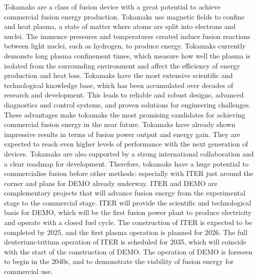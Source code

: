 Tokamaks are a class of fusion device with a great potential to achieve commercial fusion energy production. Tokamaks use magnetic fields to confine and heat plasma, a state of matter where atoms are split into electrons and nuclei. The immence pressures and temperatures created induce fusion reactions between light nuclei, such as hydrogen, to produce energy. Tokamaks currently demonste long plasma confinement times, which measure how well the plasma is isolated from the surrounding environment and affect the efficiency of energy production and heat loss. Tokamaks have the most extensive scientific and technological knowledge base, which has been accumulated over decades of research and development. This leads to reliable and robust designs, advanced diagnostics and control systems, and proven solutions for engineering challenges. These advantages make tokamaks the most promising candidates for achieving commercial fusion energy in the near future. Tokamaks have already shown impressive results in terms of fusion power output and energy gain. They are expected to reach even higher levels of performance with the next generation of devices. Tokamaks are also supported by a strong international collaboration and a clear roadmap for development. Therefore, tokamaks have a huge potential to commercialise fusion before other methods: especially with ITER just around the corner and plans for DEMO already underway. ITER and DEMO are complementary projects that will advance fusion energy from the experimental stage to the commercial stage. ITER will provide the scientific and technological basis for DEMO, which will be the first fusion power plant to produce electricity and operate with a closed fuel cycle. The construction of ITER is expected to be completed by 2025, and the first plasma operation is planned for 2026. The full deuterium-tritium operation of ITER is scheduled for 2035, which will coincide with the start of the construction of DEMO. The operation of DEMO is foreseen to begin in the 2040s, and to demonstrate the viability of fusion energy for commercial use.


